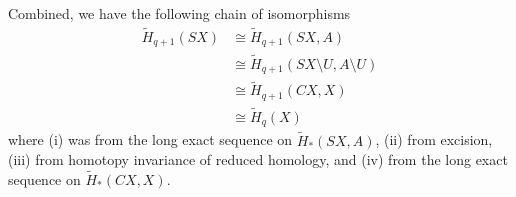\documentclass[10pt]{mypackage}
\begin{document}
\begin{solution}
\begin{center}
  \end{center}
  Combined, we have the following chain of isomorphisms
  \begin{align*}
    \widetilde{H}_{q+1}\left( SX \right) &\cong \widetilde{H}_{q+1} \left( SX,A \right) \tag{i}\\
                                         &\cong \widetilde{H}_{q+1} \left( SX\setminus U,A\setminus U \right)\tag{ii}\\
                                         &\cong \widetilde{H}_{q+1}\left( CX,X \right) \tag{iii}\\
                                         &\cong \widetilde{H}_{q}\left( X \right) \tag{iv}
  \end{align*}
  where (i) was from the long exact sequence on $ \widetilde{H}_{\ast}\left( SX,A \right) $, (ii) from excision, (iii) from homotopy invariance of reduced homology, and (iv) from the long exact sequence on $\widetilde{H}_{\ast}\left( CX,X \right)$.
\end{solution}
\end{document}
